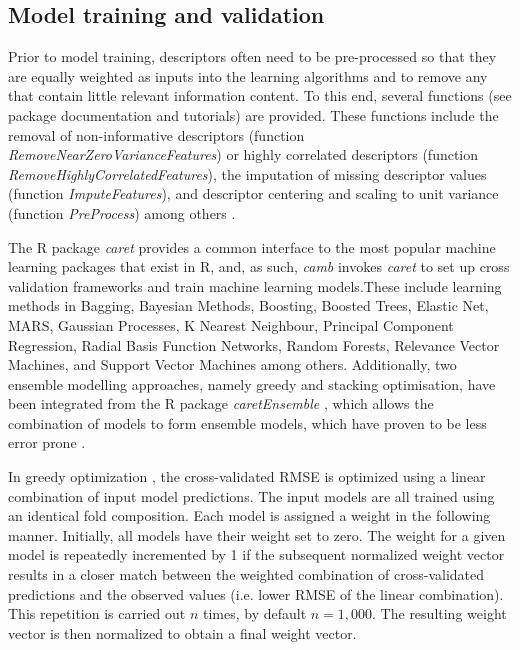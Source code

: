 \documentclass{bmcart}
\begin{document}
\subsection*{Model training and validation}

Prior to model training, descriptors often need to be pre-processed \cite{andersson} so that they are equally weighted as inputs into the learning algorithms and to remove any that contain little relevant information content.
To this end, several functions (see package documentation and tutorials)
are provided.
These functions include the removal of non-informative descriptors (function {\it RemoveNearZeroVarianceFeatures})
or highly correlated descriptors (function {\it RemoveHighlyCorrelatedFeatures}),
the imputation of missing descriptor values (function {\it ImputeFeatures}),
and descriptor centering and scaling to unit variance (function {\it PreProcess}) among others \cite{Kuhn2013}.

The R package {\it caret} provides a common interface to the most popular machine learning packages that exist in R, and, as such,
{\it camb} invokes {\it caret} to set up cross validation frameworks and
train machine learning models.These include learning methods in Bagging, Bayesian Methods, Boosting, Boosted Trees, Elastic Net, MARS, Gaussian Processes, K Nearest Neighbour, Principal Component Regression, Radial Basis Function Networks, Random Forests, Relevance Vector Machines, and Support Vector Machines among others.
Additionally, two ensemble modelling approaches, namely greedy and stacking optimisation,
have been integrated from the R package {\it caretEnsemble} \cite{caretEnsemble},
which allows the combination of models to form ensemble models, which have proven to be less error prone \cite{cortesCOX}.

In greedy optimization \cite{caruana}, the cross-validated RMSE is optimized using a linear combination of input model predictions. 
The input models are all trained using an identical fold composition.
Each model is assigned a weight in the following manner. 
Initially, all models have their weight set to zero. 
The weight for a given model is repeatedly incremented by 1 if the subsequent normalized weight vector results in a
closer match between the weighted combination of cross-validated predictions and the observed values (i.e. lower RMSE of the linear combination). 
This repetition is carried out $n$ times, by default $n = 1,000$.
The resulting weight vector is then normalized to obtain a final weight vector.
\end{document}
